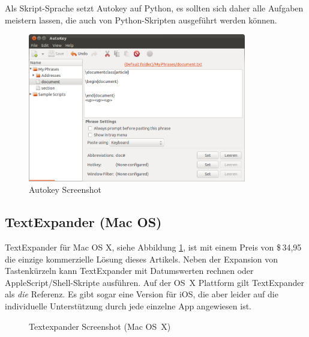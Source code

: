 \documentclass[ngerman]{dtk}%
\begin{document}
Als Skript-Sprache setzt Autokey auf Python, es sollten sich daher alle Aufgaben meistern lassen, die auch von Python-Skripten ausgeführt werden können.

\begin{figure}[h]
\begin{center}
\includegraphics[width=0.85\textwidth]{autokey1}
\caption{Autokey Screenshot}
\end{center}
\end{figure}

\subsection{TextExpander (Mac OS)}

TextExpander für Mac OS X, siehe Abbildung \ref{fig:tx}, ist mit einem Preis von \$\,34,95 die einzige kommerzielle Lösung dieses Artikels. Neben der Ex\-pan\-sion von Tastenkürzeln kann TextExpander mit Datumswerten rechnen oder AppleScript/Shell-Skripte ausführen. Auf der OS~X Plattform gilt TextExpander als \emph{die} Referenz. Es gibt sogar eine Version für iOS, die aber leider auf die individuelle Unterstützung durch jede einzelne App angewiesen ist.

\begin{figure}[h]
\begin{center}
\caption{Textexpander Screenshot (Mac OS~X)}\label{fig:tx}
\end{center}
\end{figure}
\end{document}
